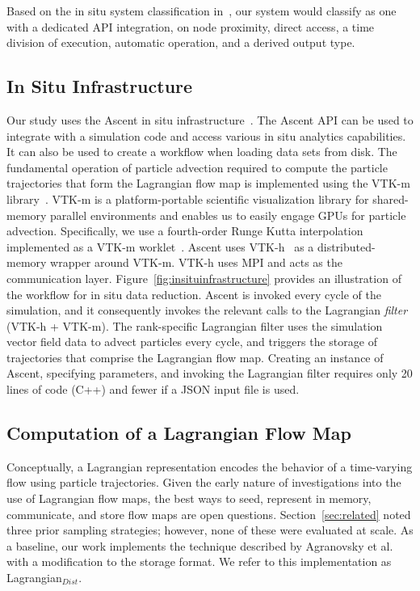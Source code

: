 Based on the in situ system classification in~\cite{childs2020istp}, our system would classify as one with a dedicated API integration, on node proximity, direct access, a time division of execution, automatic operation, and a derived output type.

\subsection{In Situ Infrastructure}
Our study uses the Ascent in situ infrastructure~\cite{Larsen2017Ascent}.
%
The Ascent API can be used to integrate with a simulation code and access various in situ analytics capabilities.
%
It can also be used to create a workflow when loading data sets from disk.
%
The fundamental operation of particle advection required to compute the particle trajectories that form the Lagrangian flow map is implemented using the VTK-m library~\cite{moreland2016vtk}.
%
VTK-m is a platform-portable scientific visualization library for shared-memory parallel environments and enables us to easily engage GPUs for particle advection.
%
Specifically, we use a fourth-order Runge Kutta interpolation implemented as a VTK-m worklet~\cite{pugmire2018performance}.
%
Ascent uses VTK-h~\cite{Larsen2017Ascent} as a distributed-memory wrapper around VTK-m.
%
VTK-h uses MPI and acts as the communication layer.
%
Figure~\ref{fig:insituinfrastructure} provides an illustration of the workflow for in situ data reduction.
%
Ascent is invoked every cycle of the simulation, and it consequently invokes the relevant calls to the Lagrangian \textit{filter} (VTK-h + VTK-m).
%
The rank-specific Lagrangian filter uses the simulation vector field data to advect particles every cycle, and triggers the storage of trajectories that comprise the Lagrangian flow map. 
%
Creating an instance of Ascent, specifying parameters, and invoking the Lagrangian filter requires only 20 lines of code (C++) and fewer if a JSON input file is used.





\subsection{Computation of a Lagrangian Flow Map}
Conceptually, a Lagrangian representation encodes the behavior of a time-varying flow using particle trajectories.
%
Given the early nature of investigations into the use of Lagrangian flow maps, the best ways to seed, represent in memory, communicate, and store flow maps are open questions. 
%
%
Section~\ref{sec:related} noted three prior sampling strategies; however, none of these were evaluated at scale.
%
As a baseline, our work implements the technique described by Agranovsky et al.~\cite{agranovsky2014improved} with a modification to the storage format. 
%
We refer to this implementation as Lagrangian$_{Dist}$.

